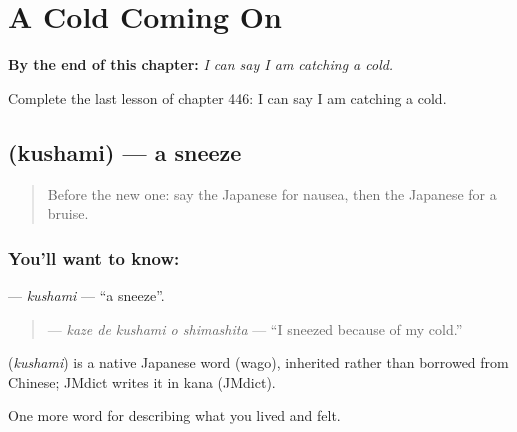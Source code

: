 
\chapter{A Cold Coming On}
\label{ch:ja-a-cold-coming-on}

\begin{chapteropening}
\textbf{By the end of this chapter:} \emph{I can say I am catching a cold.}

Complete the last lesson of chapter 446: I can say I am catching a cold.
\end{chapteropening}

\section[\texorpdfstring{\ja{くしゃみ} (kushami)}{くしゃみ (kushami)}]{ (kushami) — a sneeze}

\label{lesson:JA-C446-kushami}



\begin{quote}
Before the new one: say the Japanese for nausea, then the Japanese for a bruise.
\end{quote}

\subsection*{You'll want to know: }
\textbf{} — \emph{kushami} — \textquotedblleft{}a sneeze\textquotedblright{}.

\begin{quote}
\textbf{  } — \emph{kaze de kushami o shimashita} — \textquotedblleft{}I sneezed because of my cold.\textquotedblright{}
\end{quote}

\begin{cousinweb}
\textbf{} (\emph{kushami}) is a native Japanese word (wago), inherited rather than borrowed from Chinese; JMdict writes it in kana (JMdict).
\end{cousinweb}

\begin{grammarlens}[title={What you've built}]
One more word for describing what you lived and felt.
\end{grammarlens}


